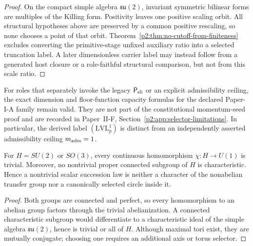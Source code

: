 \documentclass[12pt,a4paper]{article}
\begin{document}
\begin{proof}
On the compact simple algebra \(\mathfrak{su}(2)\), invariant symmetric
bilinear forms are multiples of the Killing form.  Positivity leaves one
positive scaling orbit.  All structural hypotheses above are preserved by a
common positive rescaling, so none chooses a point of that orbit.
Theorem~\ref{p2:thm:no-cutoff-from-finiteness} excludes converting the
primitive-stage unfixed auxiliary ratio into a selected truncation label.  A
later dimensionless carrier label may instead follow from a generated host
closure or a role-faithful structural comparison, but not from this scale
ratio.
\end{proof}

\begin{remark}
\label{p2:rem:legacy-module-capacity-pointer}
For roles that separately invoke the legacy \(\mathsf P_{\rm sli}\) or an
explicit admissibility ceiling, the exact dimension and floor-function
capacity formulas for the declared Paper-I-A family remain valid.  They are not
part of the constitutional momentum-seed proof and are recorded in
Paper~II-F, Section~\ref{p2:app:selector-limitations}.  In particular, the derived label
\((\mathrm{LVL}_p^1)\) is distinct from an independently asserted admissibility
ceiling \(m_{\rm adm}=1\).
\end{remark}

\begin{lemma}
\label{p2:lem:no-su2-u1-character}
For \(H=SU(2)\) or \(SO(3)\), every continuous homomorphism
\(\chi:H\to U(1)\) is trivial.  Moreover, no nontrivial proper connected
subgroup of \(H\) is characteristic.  Hence a nontrivial scalar succession
law is neither a character of the nonabelian transfer group nor a canonically
selected circle inside it.
\end{lemma}

\begin{proof}
Both groups are connected and perfect, so every homomorphism to an abelian
group factors through the trivial abelianization.  A connected characteristic
subgroup would differentiate to a characteristic ideal of the simple algebra
\(\mathfrak{su}(2)\), hence is trivial or all of \(H\).  Although maximal
tori exist, they are mutually conjugate; choosing one requires an additional
axis or torus selector.
\end{proof}
\end{document}
